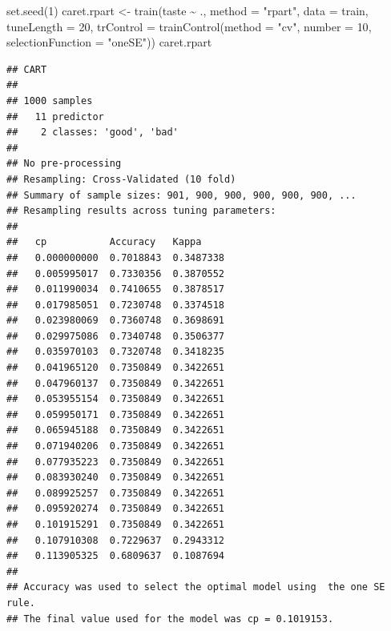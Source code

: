 \documentclass[
  spanish,
]{book}
\newenvironment{Shaded}{\begin{snugshade}}{\end{snugshade}}
\newcommand{\AttributeTok}[1]{\textcolor[rgb]{0.77,0.63,0.00}{#1}}
\newcommand{\CommentTok}[1]{\textcolor[rgb]{0.56,0.35,0.01}{\textit{#1}}}
\newcommand{\DecValTok}[1]{\textcolor[rgb]{0.00,0.00,0.81}{#1}}
\newcommand{\FunctionTok}[1]{\textcolor[rgb]{0.00,0.00,0.00}{#1}}
\newcommand{\NormalTok}[1]{#1}
\newcommand{\OtherTok}[1]{\textcolor[rgb]{0.56,0.35,0.01}{#1}}
\newcommand{\SpecialCharTok}[1]{\textcolor[rgb]{0.00,0.00,0.00}{#1}}
\newcommand{\StringTok}[1]{\textcolor[rgb]{0.31,0.60,0.02}{#1}}
\theoremstyle{break}
\theoremstyle{definition}
\theoremstyle{definition}
\theoremstyle{definition}
\theoremstyle{definition}
\theoremstyle{remark}
\begin{document}
\begin{Shaded}
\begin{Highlighting}[]
\FunctionTok{set.seed}\NormalTok{(}\DecValTok{1}\NormalTok{)}
\NormalTok{caret.rpart }\OtherTok{\textless{}{-}} \FunctionTok{train}\NormalTok{(taste }\SpecialCharTok{\textasciitilde{}}\NormalTok{ ., }\AttributeTok{method =} \StringTok{"rpart"}\NormalTok{, }\AttributeTok{data =}\NormalTok{ train, }
                     \AttributeTok{tuneLength =} \DecValTok{20}\NormalTok{,}
                     \AttributeTok{trControl =} \FunctionTok{trainControl}\NormalTok{(}\AttributeTok{method =} \StringTok{"cv"}\NormalTok{, }\AttributeTok{number =} \DecValTok{10}\NormalTok{,}
                                              \AttributeTok{selectionFunction =} \StringTok{"oneSE"}\NormalTok{)) }
\NormalTok{caret.rpart}
\end{Highlighting}
\end{Shaded}

\begin{verbatim}
## CART 
## 
## 1000 samples
##   11 predictor
##    2 classes: 'good', 'bad' 
## 
## No pre-processing
## Resampling: Cross-Validated (10 fold) 
## Summary of sample sizes: 901, 900, 900, 900, 900, 900, ... 
## Resampling results across tuning parameters:
## 
##   cp           Accuracy   Kappa    
##   0.000000000  0.7018843  0.3487338
##   0.005995017  0.7330356  0.3870552
##   0.011990034  0.7410655  0.3878517
##   0.017985051  0.7230748  0.3374518
##   0.023980069  0.7360748  0.3698691
##   0.029975086  0.7340748  0.3506377
##   0.035970103  0.7320748  0.3418235
##   0.041965120  0.7350849  0.3422651
##   0.047960137  0.7350849  0.3422651
##   0.053955154  0.7350849  0.3422651
##   0.059950171  0.7350849  0.3422651
##   0.065945188  0.7350849  0.3422651
##   0.071940206  0.7350849  0.3422651
##   0.077935223  0.7350849  0.3422651
##   0.083930240  0.7350849  0.3422651
##   0.089925257  0.7350849  0.3422651
##   0.095920274  0.7350849  0.3422651
##   0.101915291  0.7350849  0.3422651
##   0.107910308  0.7229637  0.2943312
##   0.113905325  0.6809637  0.1087694
## 
## Accuracy was used to select the optimal model using  the one SE rule.
## The final value used for the model was cp = 0.1019153.
\end{verbatim}

\begin{Shaded}
\end{Shaded}
\end{document}
